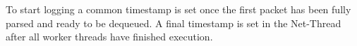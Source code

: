         To start logging a common timestamp is set once the first packet has been fully parsed and ready to be dequeued.
        A final timestamp is set in the Net-Thread after all worker threads have finished execution.


